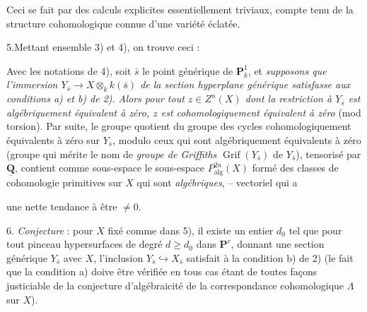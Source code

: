 \documentclass[11pt,a4paper]{article}
\begin{document}
Ceci se fait par des calculs explicites essentiellement triviaux, compte tenu de la
structure cohomologique connue d'une variété éclatée.

5.\quad Mettant ensemble 3) et 4), on trouve ceci :

\struck{\ill{}} Avec les notations de 4),  soit $\bar s$ le
point générique de $\mathbf{P}^1_k$, et \emph{supposons que l'immersion $Y_{\bar
s} \to X \otimes_k k(\bar s)$ de la section hyperplane générique satisfasse aux
conditions a) et b) de 2).} \struck{\ill{}} \emph{Alors pour tout $z \in Z^n(X)$
dont la restriction à $Y_{\bar s}$ est algébriquement équivalent à zéro, $z$ est
cohomologiquement équivalent à zéro} (mod torsion). \struck{\ill{}} Par suite, le groupe quotient du
groupe des cycles cohomologiquement équivalents à zéro \struck{\ill{}} sur $Y_{\bar
s}$, modulo ceux qui sont algébriquement équivalents à zéro (groupe qui mérite le
nom de \emph{groupe de Griffiths} $\operatorname{Grif}(Y_{\bar s})$ de $Y_{\bar
s}$), tensorisé par $\underline{\mathbf{Q}}$, contient comme sous-espace le
sous-espace $P^{2n}_{\mathrm{alg}}(X)$ formé des classes de cohomologie primitives
sur $X$ qui sont \emph{algébriques}, -- vectoriel qui a



une nette tendance à être $\neq 0$.

6.\quad {} \emph{Conjecture} : pour $X$  fixé comme dans 5),  il existe un
entier $d_0$ tel que pour tout pinceau  
 hypersurfaces de degré $d \geqslant d_0$ dans $\mathbf{P}^r$, donnant
une section générique $Y_{\bar s}$ avec $X$, l'inclusion $Y_{\bar s}
\hookrightarrow X_{\bar s}$ satisfait à la condition b) de 2) (le fait que la
condition a) doive être vérifiée en tous cas étant de toutes façons justiciable de
la conjecture d'algébraicité de la correspondance cohomologique $\Lambda$ sur
$X$).
\end{document}
